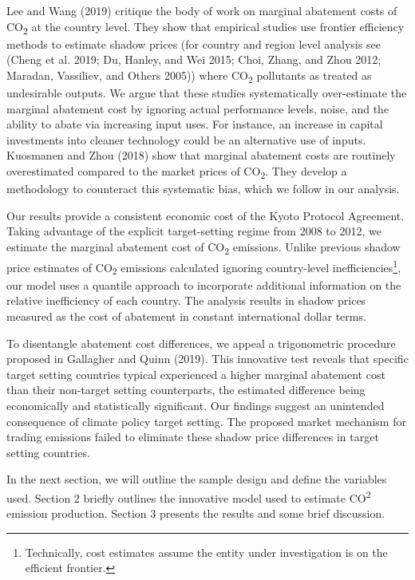 \documentclass[
  10pt,
]{article}
\begin{document}
Lee and Wang (2019) critique the body of work on marginal abatement
costs of CO\textsubscript{2} at the country level. They show that
empirical studies use frontier efficiency methods to estimate shadow
prices (for country and region level analysis see (Cheng et al. 2019;
Du, Hanley, and Wei 2015; Choi, Zhang, and Zhou 2012; Maradan,
Vassiliev, and Others 2005)) where CO\textsubscript{2} pollutants as
treated as undesirable outputs. We argue that these studies
systematically over-estimate the marginal abatement cost by ignoring
actual performance levels, noise, and the ability to abate via
increasing input uses. For instance, an increase in capital investments
into cleaner technology could be an alternative use of inputs. Kuosmanen
and Zhou (2018) show that marginal abatement costs are routinely
overestimated compared to the market prices of CO\textsubscript{2}. They
develop a methodology to counteract this systematic bias, which we
follow in our analysis.

Our results provide a consistent economic cost of the Kyoto Protocol
Agreement. Taking advantage of the explicit target-setting regime from
2008 to 2012, we estimate the marginal abatement cost of
CO\textsubscript{2} emissions. Unlike previous shadow price estimates of
CO\textsubscript{2} emissions calculated ignoring country-level
inefficiencies\footnote{Technically, cost estimates assume the entity
  under investigation is on the efficient frontier.}, our model uses a
quantile approach to incorporate additional information on the relative
inefficiency of each country. The analysis results in shadow prices
measured as the cost of abatement in constant international dollar
terms.

To disentangle abatement cost differences, we appeal a trigonometric
procedure proposed in Gallagher and Quinn (2019). This innovative test
reveals that specific target setting countries typical experienced a
higher marginal abatement cost than their non-target setting
counterparts, the estimated difference being economically and
statistically significant. Our findings suggest an unintended
consequence of climate policy target setting. The proposed market
mechanism for trading emissions failed to eliminate these shadow price
differences in target setting countries.

In the next section, we will outline the sample design and define the
variables used. Section 2 briefly outlines the innovative model used to
estimate CO\textsuperscript{2} emission production. Section 3 presents
the results and some brief discussion.
\end{document}
